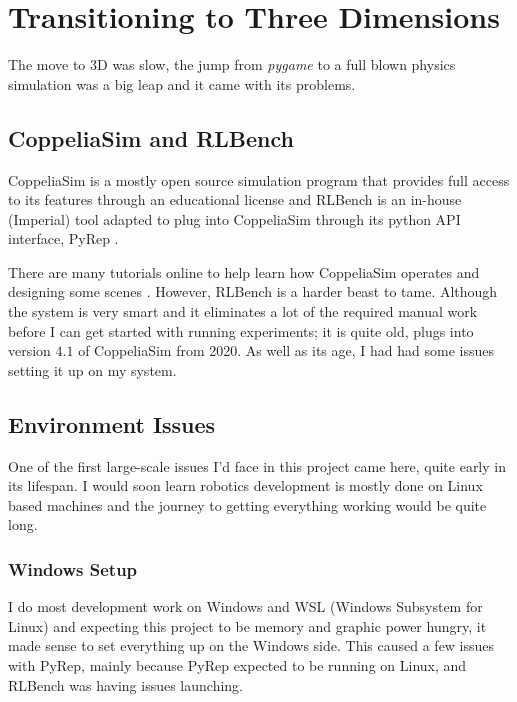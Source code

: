\section{Transitioning to Three Dimensions}
The move to 3D was slow, the jump from \emph{pygame} to a full blown physics simulation was a big leap and it came with its problems.

\subsection{CoppeliaSim and RLBench}

CoppeliaSim is a mostly open source simulation program that provides full access to its features through an educational license and RLBench \cite{james2019rlbenchrobotlearningbenchmark}is an in-house (Imperial) tool adapted to plug into CoppeliaSim through its python API interface, PyRep \cite{pyrep2020}. 

There are many tutorials online to help learn how CoppeliaSim operates and designing some scenes . However, RLBench is a harder beast to tame. Although the system is very smart and it eliminates a lot of the required manual work before I can get started with running experiments; it is quite old, plugs into version $4.1$ of CoppeliaSim from 2020. As well as its age, I had had some issues setting it up on my system. 

\subsection{Environment Issues}
One of the first large-scale issues I'd face in this project came here, quite early in its lifespan. I would soon learn robotics development is mostly done on Linux based machines and the journey to getting everything working would be quite long.

\subsubsection{Windows Setup}
I do most development work on Windows and WSL (Windows Subsystem for Linux) \cite{microsoftWSL} and expecting this project to be memory and graphic power hungry, it made sense to set everything up on the Windows side. This caused a few issues with PyRep, mainly because PyRep expected to be running on Linux, and RLBench was having issues launching.

